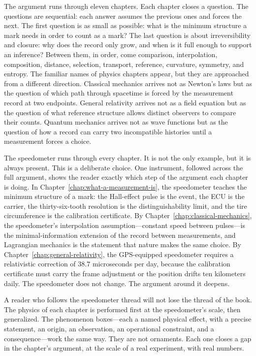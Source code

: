 The argument runs through eleven chapters. Each chapter closes a question. The
questions are sequential: each answer assumes the previous ones and forces the
next. The first question is as small as possible: what is the minimum structure
a mark needs in order to count as a mark? The last question is about
irreversibility and closure: why does the record only grow, and when is it full
enough to support an inference? Between them, in order, come comparison,
interpolation, composition, distance, selection, transport, reference, curvature,
symmetry, and entropy. The familiar names of physics chapters appear, but they
are approached from a different direction. Classical mechanics arrives not as
Newton's laws but as the question of which path through spacetime is forced by
the measurement record at two endpoints. General relativity arrives not as a
field equation but as the question of what reference structure allows distinct
observers to compare their counts. Quantum mechanics arrives not as wave
functions but as the question of how a record can carry two incompatible
histories until a measurement forces a choice.

\bigskip

The speedometer runs through every chapter. It is not the only example, but it
is always present. This is a deliberate choice. One instrument, followed across
the full argument, shows the reader exactly which step of the argument each
chapter is doing. In Chapter~\ref{chap:what-a-measurement-is}, the speedometer
teaches the minimum structure of a mark: the Hall-effect pulse is the event, the
ECU is the carrier, the thirty-six-tooth resolution is the distinguishability
limit, and the tire circumference is the calibration certificate. By
Chapter~\ref{chap:classical-mechanics}, the speedometer's interpolation
assumption---constant speed between pulses---is the minimal-information extension
of the record between measurements, and Lagrangian mechanics is the statement
that nature makes the same choice. By Chapter~\ref{chap:general-relativity},
the GPS-equipped speedometer requires a relativistic correction of $38.7$
microseconds per day, because the calibration certificate must carry the frame
adjustment or the position drifts ten kilometers daily. The speedometer does not
change. The argument around it deepens.

A reader who follows the speedometer thread will not lose the thread of the
book. The physics of each chapter is performed first at the speedometer's scale,
then generalized. The phenomenon boxes---each a named physical effect, with a
precise statement, an origin, an observation, an operational constraint, and a
consequence---work the same way. They are not ornaments. Each one closes a gap
in the chapter's argument, at the scale of a real experiment, with real numbers.

